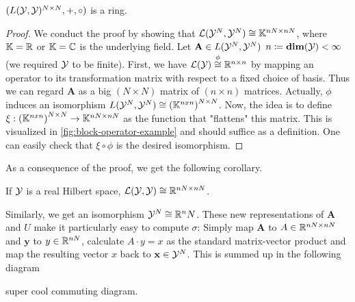 \begin{theorem}
	$(L(\mathcal{Y}, \mathcal{Y})^{N\times N}, +, \circ)$ is a  ring.
\end{theorem}
\begin{proof}
	We conduct the proof by showing that $\mathcal{L}(\mathcal{Y}^N, \mathcal{Y}^N) \cong \mathbb{K}^{nN \times nN}$, where $\mathbb{K} = \mathbb{R}$ or $\mathbb{K} = \mathbb{C}$ is the underlying field.
	Let $\mathbf{A} \in L(\mathcal{Y}^N, \mathcal{Y}^N)$ $n \coloneqq \mathbf{dim}(\mathcal{Y}) < \infty$ (we required $\mathcal{Y}$ to be finite).
	First, we have $\mathcal{L}(\mathcal{Y}) \stackrel{\phi}{\cong}\mathbb{R}^{n\times n}$ by mapping an operator to its transformation matrix with respect to a fixed choice of basis.
	Thus we can regard $\mathbf{A}$ as a big $(N \times N)$ matrix of $(n \times n)$ matrices.
	Actually, $\phi$ induces an isomorphism $L(\mathcal{Y}^N, \mathcal{Y}^N) \cong \left(\mathbb{K}^{nxn}\right)^{N \times N}$.
	Now, the idea is to define $\xi:\left(\mathbb{K}^{nxn}\right)^{N \times N} \rightarrow \mathbb{K}^{nN \times nN}$ as the function that "flattens" this matrix.
	This is visualized in \cref{fig:block-operator-example} and should suffice as a definition.
	One can easily check that $\xi \circ \phi$ is the desired isomorphism.
\end{proof}



As a consequence of the proof, we get the following corollary.
\begin{corollary}
	\label{cor:matrix-ring-equivalence}
	If $\mathcal{Y}$ is a real Hilbert space, $\mathcal{L}(\mathcal{Y}, \mathcal{Y}) \cong \mathbb{R}^{nN \times nN}$.
\end{corollary}
Similarly, we get an isomorphism $\mathcal{Y}^N \cong \mathbb{R}^nN$.
These new representations of $\mathbf{A}$ and $U$ make it particularly easy to compute $\sigma$:
Simply map $\mathbf{A}$ to $A \in \mathbb{R}^{nN \times nN}$ and $\mathbf{y}$ to $y \in \mathbb{R}^{nN}$, calculate $A \cdot y = x$ as the standard matrix-vector product and map the resulting vector $x$ back to $\mathbf{x} \in\mathcal{Y}^N$.
This is summed up in the following diagram

\begin{corollary}
	\label{cor:matrix-vector-equivalence}
	super cool commuting diagram.
\end{corollary}